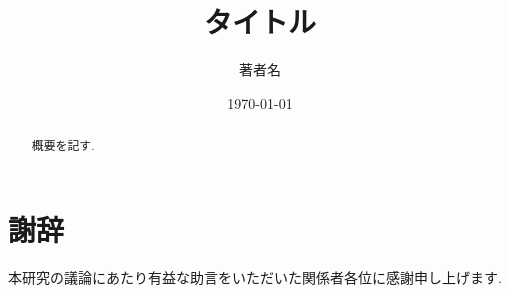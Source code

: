 \documentclass{jlreq}
\title{タイトル}
\author{著者名}
\date{\today}
\begin{document}
\maketitle

\begin{abstract}
  概要を記す.
\end{abstract}

\tableofcontents
\newpage






\section*{謝辞}
本研究の議論にあたり有益な助言をいただいた関係者各位に感謝申し上げます.

\nocite{*}
\printbibliography[title=参考文献]
\end{document}
